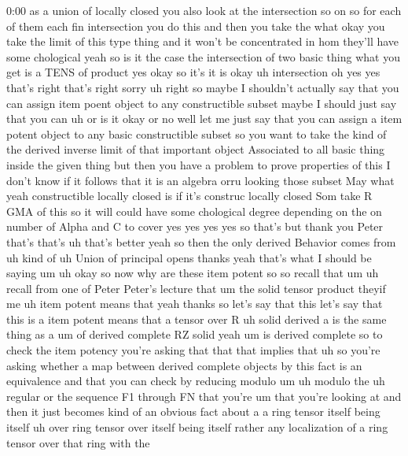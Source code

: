\begin{unfinished}{0:00}
as  a  union  of  locally  closed  you  also
look  at  the  intersection  so  on  so  for
each  of  them  each  fin  intersection  you
do  this  and  then  you  take  the  what  okay
you  take  the  limit  of  this  type  thing
and  it  won't  be  concentrated  in  hom
they'll  have  some  chological  yeah  so  is
it  the  case  the  intersection  of  two
basic  thing  what  you  get  is  a  TENS  of
product  yes  okay  so  it's  it  is
okay
uh
intersection  oh  yes  yes  that's  right
that's  right  sorry
uh  right  so  maybe  I  shouldn't  actually
say  that  you  can  assign  item  poent
object  to  any  constructible  subset  maybe
I  should  just  say  that  you  can  uh  or  is
it  okay  or  no  well  let  me  just  say  that
you  can  assign  a  item  potent  object  to
any  basic  constructible  subset  so  you
want  to  take  the  kind  of  the  derived
inverse  limit  of  that  important  object
Associated  to  all  basic  thing  inside  the
given  thing  but  then  you  have  a  problem
to  prove  properties  of  this  I  don't  know
if  it  follows  that  it  is  an  algebra
orru  looking  those  subset  May
what  yeah  constructible  locally  closed
is  if  it's  construc  locally  closed  Som
take  R  GMA  of  this  so  it  will  could  have
some  chological  degree  depending  on  the
on  number  of  Alpha  and  C  to  cover  yes
yes  yes  yes  so  that's  but  thank  you
Peter  that's  that's  uh  that's  better
yeah  so  then  the  only  derived  Behavior
comes  from  uh  kind  of  uh  Union  of
principal  opens  thanks  yeah  that's  what
I  should  be  saying  um  uh  okay  so  now  why
are  these  item  potent
so  so  recall  that
um  uh  recall  from  one  of  Peter  Peter's
lecture  that  um  the  solid  tensor
product  theyif
me  uh  item  potent  means  that  yeah  thanks
so  let's  say  that  this  let's  say  that
this  is  a  item  potent  means  that  a
tensor  over  R  uh  solid  derived  a  is  the
same  thing  as
a  um  of  derived
complete  RZ  solid
yeah
um  is  derived
complete  so  to  check  the  item  potency
you're  asking  that  that  that  implies
that  uh  so  you're  asking  whether  a  map
between  derived  complete  objects  by  this
fact  is  an  equivalence  and  that  you  can
check  by  reducing
modulo
um  uh  modulo  the  uh  regular  or  the
sequence  F1  through  FN  that  you're
um  that  you're  looking  at  and  then  it
just  becomes  kind  of  an  obvious  fact
about  a  a  ring  tensor  itself  being
itself  uh  over  ring  tensor  over  itself
being  itself  rather  any  localization  of
a  ring  tensor  over  that  ring  with  the

\end{unfinished}
